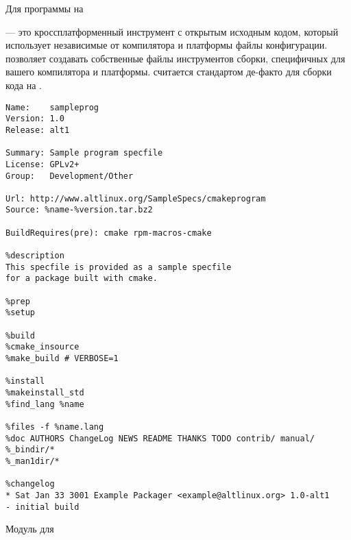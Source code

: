  Для программы на 
	
	 --- это кроссплатформенный инструмент с открытым исходным кодом, который использует
	независимые от компилятора и платформы файлы конфигурации.  позволяет создавать
	собственные файлы инструментов сборки, специфичных для вашего компилятора и платформы. 
	считается стандартом де-факто для сборки кода на .
\begin{Verbatim}[breaklines=true,breakanywhere=true,fontsize=\scriptsize]
Name:    sampleprog
Version: 1.0
Release: alt1
		
Summary: Sample program specfile
License: GPLv2+
Group:   Development/Other
		
Url: http://www.altlinux.org/SampleSpecs/cmakeprogram
Source: %name-%version.tar.bz2
		
BuildRequires(pre): cmake rpm-macros-cmake
		
%description
This specfile is provided as a sample specfile
for a package built with cmake.
		
%prep
%setup
		
%build
%cmake_insource
%make_build # VERBOSE=1
		
%install
%makeinstall_std
%find_lang %name
		
%files -f %name.lang
%doc AUTHORS ChangeLog NEWS README THANKS TODO contrib/ manual/
%_bindir/*
%_man1dir/*
		
%changelog
* Sat Jan 33 3001 Example Packager <example@altlinux.org> 1.0-alt1
- initial build
\end{Verbatim}
	
 Модуль для 
	

